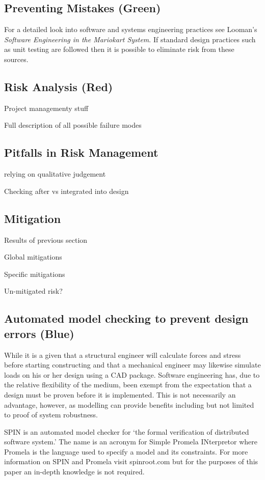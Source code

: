 \subsection{Preventing Mistakes (Green)}
For a detailed look into software and systems engineering practices see 
Looman's \emph{Software Engineering in the Mariokart System}\cite{
Software Engineering in the Mariokart System}. If standard design practices
such as unit testing are followed then it is possible to eliminate risk from these sources. 

\subsection{Risk Analysis (Red)}


Project managementy stuff

 Full description of all possible failure modes
 
\subsection{Pitfalls in Risk Management}
relying on qualitative judgement

Checking after vs integrated into design



\subsection{Mitigation}
Results of previous section

Global mitigations

Specific mitigations

Un-mitigated risk?

\subsection{Automated model checking to prevent design errors (Blue)}
While it is a given that a structural engineer will calculate forces and stress before
starting constructing and that a mechanical engineer may likewise simulate loads
on his or her design using a CAD package. Software engineering has,
due to the relative flexibility of the medium, been exempt from the expectation
 that a design must be proven before it is implemented. This is not 
 necessarily an advantage, however, as modelling can provide benefits
 including but not limited to proof of system robustness.

SPIN is an automated model checker for `the formal verification of
distributed software system.'\cite{spinroot} The name is an acronym for
Simple Promela INterpretor where Promela is the language used to 
specify a model and its constraints. For more information on SPIN and
Promela visit spinroot.com but for the purposes of this paper an in-depth
knowledge is not required.

